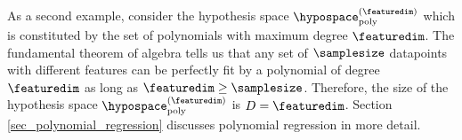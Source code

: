 \documentclass[12pt]{report}
\newcommand{\sizehypospace}{D}
\begin{document}
As a second example, consider the hypothesis space 
$\hypospace_{\rm poly}^{(\featuredim)}$ which is constituted 
by the set of polynomials with maximum degree $\featuredim$. 
The fundamental theorem of algebra tells us that any set 
of $\samplesize$ datapoints with different features can 
be perfectly fit by a polynomial of degree $\featuredim$ 
as long as $\featuredim \geq \samplesize$. Therefore, the 
size of the hypothesis space $\hypospace_{\rm poly}^{(\featuredim)}$ 
is $\sizehypospace=\featuredim$. Section \ref{sec_polynomial_regression} 
discusses polynomial regression in more detail. 



%
%
\end{document}
